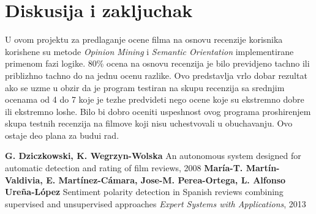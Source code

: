 \documentclass[cyr]{bibl}
\begin{document}
\section{Diskusija i zakljuchak}
\begin{justify}
U ovom projektu za predlaganje ocene filma na osnovu recenzije korisnika korish\cc ene su metode \textit{\Lat Opinion Mining} i \textit{\Lat Semantic Orientation} implementirane primenom fazi logike. 80\% ocena na osnovu recenzija je bilo previdjeno tachno ili priblizhno  tachno do na jednu ocenu razlike. Ovo predstavlja vrlo dobar rezultat ako se uzme u obzir da je program testiran na skupu recenzija sa srednjim ocenama od 4 do 7 koje je tezhe predvideti nego ocene koje su ekstremno dobre ili ekstremno loshe. Bilo bi dobro oceniti uspeshnost ovog programa proshirenjem skupa testnih recenzija na filmove koji nisu uchestvovali u obuchavanju. Ovo ostaje deo plana za budu\cc i rad.
\end{justify}

\begin{thebibliography}{99}
{\Lat
\textbf{G. Dziczkowski, K. Wegrzyn-Wolska} An autonomous system designed for automatic detection and rating of film reviews, 2008
\textbf{Mar\'{i}a-T. Mart\'{i}n-Valdivia, E. Mart\'{i}nez-C\'{a}mara, Jose-M. Perea-Ortega, L. Alfonso Ure\~{n}a-L\'{o}pez} Sentiment polarity detection in Spanish reviews combining supervised
and unsupervised approaches \emph{Expert Systems with Applications}, 2013
}
\end{thebibliography}
\begin{keyword}
\end{keyword}
\end{document}

